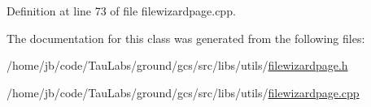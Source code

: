 \-Definition at line 73 of file filewizardpage.\-cpp.



\-The documentation for this class was generated from the following files\-:\begin{DoxyCompactItemize}
\item 
/home/jb/code/\-Tau\-Labs/ground/gcs/src/libs/utils/\hyperlink{filewizardpage_8h}{filewizardpage.\-h}\item 
/home/jb/code/\-Tau\-Labs/ground/gcs/src/libs/utils/\hyperlink{filewizardpage_8cpp}{filewizardpage.\-cpp}\end{DoxyCompactItemize}
